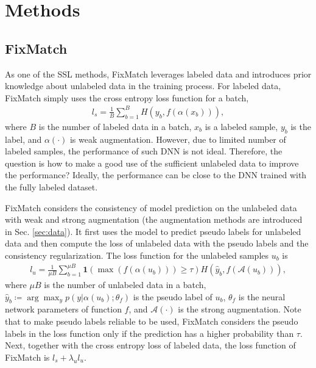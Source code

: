 \section{Methods}\label{sec:method}
\subsection{FixMatch} 
As one of the SSL methods, FixMatch \citep{sohn2020fixmatch} leverages labeled data and introduces prior knowledge about unlabeled data in the training process. For labeled data, FixMatch simply uses the cross entropy loss function for a batch,
\begin{eqnarray}
l_s = \frac{1}{B}\sum_{b=1}^B H(y_b, f(\alpha(x_b))),
\end{eqnarray}
where $B$ is the number of labeled data in a batch, $x_b$ is a labeled sample, $y_b$ is the label, and $\alpha(\cdot)$ is weak augmentation.
However, due to limited number of labeled samples, the performance of such DNN is not ideal. Therefore, the question is how to make a good use of the sufficient unlabeled data to improve the performance? Ideally, the performance can be close to the DNN trained with the fully labeled dataset.

FixMatch considers the consistency of model prediction on the unlabeled data with weak and strong augmentation (the augmentation methods are introduced in Sec. \ref{sec:data}). It first uses the model to predict pseudo labels for unlabeled data and then compute the loss of unlabeled data with the pseudo labels and the consistency regularization. The loss function for the unlabeled samples $u_b$ is
\begin{eqnarray}
l_{u} = \frac{1}{\mu B}\sum_{b=1}^{\mu B} \mathbf{1}(\max(f(\alpha(u_b)))\geq\tau) H(\hat{y}_b, f(\mathcal{A}({u}_b))),\label{eq:bsl}
\end{eqnarray}
where $\mu B$ is the number of unlabeled data in a batch, $\hat{y}_b\coloneqq \arg\max_{y}p(y|\alpha(u_b);\theta_f)$ is the pseudo label of $u_b$, $\theta_f$ is the neural network parameters of function $f$, and $\mathcal{A}(\cdot)$ is the strong augmentation. 
Note that to make pseudo labels reliable to be used, FixMatch considers the pseudo labels in the loss function only if the prediction has a higher probability than $\tau$. Next, together with the cross entropy loss of labeled data, the loss function of FixMatch is $l_s + \lambda_u l_u$. 

